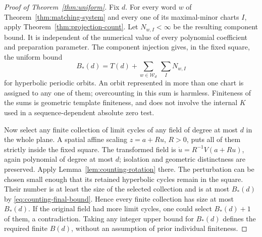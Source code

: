 \begin{proof}[Proof of Theorem~\ref{thm:uniform}]
Fix $d$.  For every word $w$ of Theorem~\ref{thm:matching-system}
and every one of its maximal-minor charts $I$, apply
Theorem~\ref{thm:projection-count}.  Let $N_{w,I}<\infty$ be the
resulting component bound.  It is independent of the numerical
value of every polynomial coefficient and preparation parameter.
The component injection gives, in the fixed square, the uniform
bound
\begin{equation}\label{eq:counting-final-bound}
 B_*(d)=T(d)+\sum_{w\in\mathcal W_d}\ \sum_I N_{w,I}
\end{equation}
for hyperbolic periodic orbits.  An orbit represented in more than
one chart is assigned to any one of them; overcounting in this sum
is harmless.  Finiteness of the sums is geometric template
finiteness, and does not involve the internal $K$ used in a
sequence-dependent absolute zero test.

Now select any finite collection of limit cycles of any field of
degree at most $d$ in the whole plane.  A spatial affine scaling
$z=a+Ru$, $R>0$, puts all of them strictly inside the fixed square.
The transformed field is
$\dot u=R^{-1}V(a+Ru)$, again polynomial of degree at most $d$;
isolation and geometric distinctness are preserved.  Apply
Lemma~\ref{lem:counting-rotation} there.  The perturbation can be
chosen small enough that its retained hyperbolic cycles remain in
the square.  Their number is at least the size of the selected
collection and is at most $B_*(d)$ by
\eqref{eq:counting-final-bound}.  Hence every finite collection has
size at most $B_*(d)$.  If the original field had more limit cycles,
one could select $B_*(d)+1$ of them, a contradiction.  Taking any
integer upper bound for $B_*(d)$ defines the required finite
$B(d)$, without an assumption of prior individual finiteness.
\end{proof}
